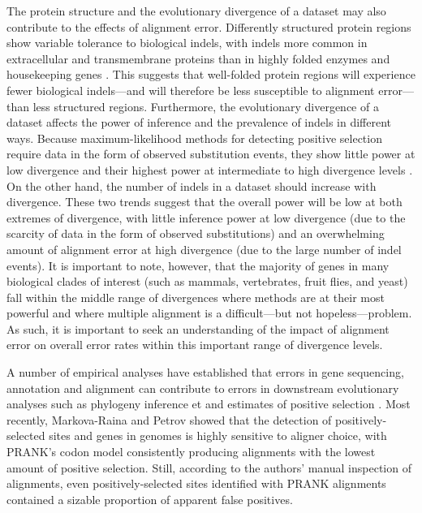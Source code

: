 \documentclass{mbe}
\begin{document}


The protein structure and the evolutionary divergence of a dataset may
also contribute to the effects of alignment error. Differently
structured protein regions show variable tolerance to biological
indels, with indels more common in extracellular and transmembrane
proteins than in highly folded enzymes and housekeeping genes
\citep{delaChaux2007DNA} . This suggests that well-folded protein
regions will experience fewer biological indels---and will therefore
be less susceptible to alignment error---than less structured
regions. Furthermore, the evolutionary divergence of a dataset affects
the power of \sw inference and the prevalence of indels in different
ways. Because maximum-likelihood methods for detecting positive
selection require data in the form of observed substitution events,
they show little power at low divergence and their highest power at
intermediate to high divergence levels
\citep{Anisimova2001Accuracy}. On the other hand, the number of indels
in a dataset should increase with divergence. These two trends suggest
that the overall power will be low at both extremes of divergence,
with little inference power at low divergence (due to the scarcity of
data in the form of observed substitutions) and an overwhelming amount
of alignment error at high divergence (due to the large number of
indel events). It is important to note, however, that the majority of
genes in many biological clades of interest (such as mammals,
vertebrates, fruit flies, and yeast) fall within the middle range of
divergences where \sw methods are at their most powerful and where
multiple alignment is a difficult---but not hopeless---problem. As
such, it is important to seek an understanding of the impact of
alignment error on overall error rates within this important range of
divergence levels.

A number of empirical analyses have established that errors in gene
sequencing, annotation and alignment can contribute to errors in
downstream evolutionary analyses such as phylogeny inference
\citep{Wong2008Alignment} et and estimates of positive selection
\citep{Schneider2009Estimates,Markova-Raina2011High} . Most recently,
Markova-Raina and Petrov \citeyearpar{Markova-Raina2011High} showed
that the detection of positively-selected sites and genes in \Dr
genomes is highly sensitive to aligner choice, with PRANK's codon
model consistently producing alignments with the lowest amount of
positive selection. Still, according to the authors' manual inspection
of alignments, even positively-selected sites identified with PRANK
alignments contained a sizable proportion of apparent false positives.
\end{document}
